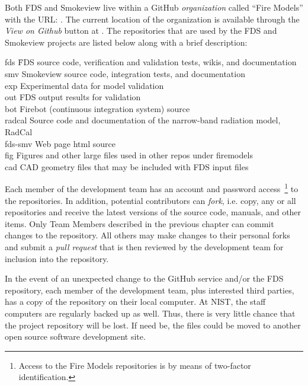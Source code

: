 \documentclass[11pt]{book}
\begin{document}
Both FDS and Smokeview live within a GitHub \emph{organization} called ``Fire Models'' with the URL: \href{https://github.com/firemodels} {}.  The current location of the organization is available through the \emph{View on Github} button at \href{https://pages.nist.gov/fds-smv} {}.  The repositories that are used by the FDS and Smokeview projects are listed below along with a brief description:
\begin{tabbing}
fds \hspace{0.5in} \= FDS source code, verification and validation tests, wikis, and documentation \\
smv                \> Smokeview source code, integration tests, and documentation \\
exp                \> Experimental data for model validation \\
out                \> FDS output results for validation \\
bot                \> Firebot (continuous integration system) source \\
radcal             \> Source code and documentation of the narrow-band radiation model, RadCal \\
fds-smv            \> Web page html source \\
fig                \> Figures and other large files used in other repos under firemodels \\
cad                \> CAD geometry files that may be included with FDS input files
\end{tabbing}
Each member of the development team has an account and password access~\footnote{Access to the Fire Models repositories is by means of two-factor identification.} to the repositories. In addition, potential contributors can {\em fork}, i.e. copy, any or all repositories and receive the latest versions of the source code, manuals, and other items. Only Team Members described in the previous chapter can commit changes to the repository. All others may make changes to their personal forks and submit a {\em pull request} that is then reviewed by the development team for inclusion into the repository.

In the event of an unexpected change to the GitHub service and/or the FDS repository, each member of the development team, plus interested third parties, has a copy of the repository on their local computer. At NIST, the staff computers are regularly backed up as well. Thus, there is very little chance that the project repository will be lost. If need be, the files could be moved to another open source software development site.
\end{document}
